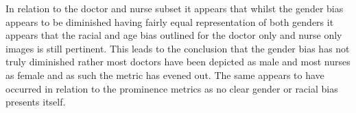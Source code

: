 In relation to the doctor and nurse subset it appears that whilst the gender bias appears to be diminished having fairly equal representation of both genders it appears that the racial and age bias outlined for the doctor only and nurse only images is still pertinent. This leads to the conclusion that the gender bias has not truly diminished rather most doctors have been depicted as male and most nurses as female and as such the metric has evened out. The same appears to have occurred in relation to the prominence metrics as no clear gender or racial bias presents itself. 



